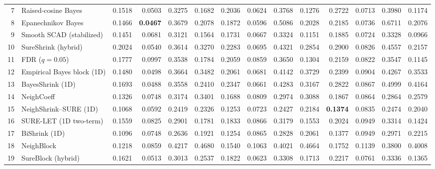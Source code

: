 \documentclass[12pt]{article}
\theoremstyle{definition}
\theoremstyle{definition}
\begin{document}
\begin{table}
\begin{tabular}{@{}r p{7.55cm}*{12}{r}@{}}
7 & Raised-cosine Bayes \citep{ReinaSousa2026RaisedCosine} & 0.1518 & 0.0503 & 0.3275 & 0.1682 & 0.2036 & 0.0624 & 0.3768 & 0.1276 & 0.2722 & 0.0713 & 0.3980 & 0.1174 \\
8 & Epanechnikov Bayes \citep{BarriosSousa2025Epanechnikov} & 0.1466 & \textbf{0.0467} & 0.3679 & 0.2078 & 0.1872 & 0.0596 & 0.5086 & 0.2028 & 0.2185 & 0.0736 & 0.6711 & 0.2076 \\
9 & Smooth SCAD (stabilized) \citep{KulkarniEtAl2026SmoothSCAD} & 0.1451 & 0.0681 & 0.3121 & 0.1564 & 0.1731 & 0.0667 & 0.3324 & 0.1151 & 0.1885 & 0.0724 & 0.3328 & 0.0966 \\
10 & SureShrink (hybrid) \citep{DonohoJohnstone1995} & 0.2024 & 0.0540 & 0.3614 & 0.3270 & 0.2283 & 0.0695 & 0.4321 & 0.2854 & 0.2900 & 0.0826 & 0.4557 & 0.2157 \\
11 & FDR ($q=0.05$) \citep{AbramovichEtAl2006FDR} & 0.1777 & 0.0997 & 0.3538 & 0.1784 & 0.2059 & 0.0859 & 0.3650 & 0.1304 & 0.2159 & 0.0822 & 0.3547 & 0.1145 \\
12 & Empirical Bayes block (1D) \citep{AbramovichBesbeasSapatinas2002BlockEB} & 0.1480 & 0.0498 & 0.3664 & 0.3482 & 0.2061 & 0.0681 & 0.4142 & 0.3729 & 0.2399 & 0.0904 & 0.4267 & 0.3533 \\
13 & BayesShrink (1D) \citep{ChangYuVetterli2000BayesShrink} & 0.1693 & 0.0488 & 0.3558 & 0.2410 & 0.2347 & 0.0661 & 0.4283 & 0.3167 & 0.2822 & 0.0867 & 0.4999 & 0.4164 \\
14 & NeighCoeff \citep{CaiSilverman2001Neigh} & 0.1326 & 0.0748 & 0.3174 & 0.3401 & 0.1688 & 0.0809 & 0.2974 & 0.3088 & 0.1867 & 0.0864 & 0.2864 & 0.2579 \\
15 & NeighShrink--SURE (1D) \citep{ZhouCheng2008NeighShrinkSURE} & 0.1068 & 0.0592 & 0.2419 & 0.2326 & 0.1253 & 0.0723 & 0.2427 & 0.2184 & \textbf{0.1374} & 0.0835 & 0.2474 & 0.2040 \\
16 & SURE-LET (1D two-term) \citep{BluLuisier2007SURELET} & 0.1559 & 0.0825 & 0.2901 & 0.1781 & 0.1833 & 0.0866 & 0.3179 & 0.1553 & 0.2024 & 0.0949 & 0.3314 & 0.1424 \\
17 &  BiShrink (1D) \citep{SendurSelesnick2002BiShrink} & 0.1096 & 0.0748 & 0.2636 & 0.1921 & 0.1254 & 0.0865 & 0.2828 & 0.2061 & 0.1377 & 0.0949 & 0.2971 & 0.2215 \\
18 & NeighBlock \citep{CaiSilverman2001Neigh} & 0.1218 & 0.0859 & 0.4217 & 0.4680 & 0.1540 & 0.1063 & 0.4021 & 0.4664 & 0.1752 & 0.1139 & 0.3800 & 0.4008 \\
19 & SureBlock (hybrid) \citep{CaiZhou2009SureBlock} & 0.1621 & 0.0513 & 0.3013 & 0.2537 & 0.1822 & 0.0623 & 0.3308 & 0.1713 & 0.2217 & 0.0761 & 0.3336 & 0.1365 \\

\end{tabular}
\end{table}
\end{document}
